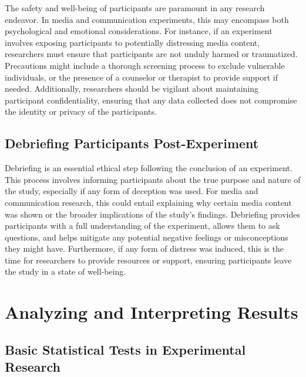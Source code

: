\documentclass[
  b5paper]{book}
\begin{document}
The safety and well-being of participants are paramount in any research endeavor. In media and communication experiments, this may encompass both psychological and emotional considerations. For instance, if an experiment involves exposing participants to potentially distressing media content, researchers must ensure that participants are not unduly harmed or traumatized. Precautions might include a thorough screening process to exclude vulnerable individuals, or the presence of a counselor or therapist to provide support if needed. Additionally, researchers should be vigilant about maintaining participant confidentiality, ensuring that any data collected does not compromise the identity or privacy of the participants.

\hypertarget{debriefing-participants-post-experiment}{%
\subsection*{Debriefing Participants Post-Experiment}\label{debriefing-participants-post-experiment}}

Debriefing is an essential ethical step following the conclusion of an experiment. This process involves informing participants about the true purpose and nature of the study, especially if any form of deception was used. For media and communication research, this could entail explaining why certain media content was shown or the broader implications of the study's findings. Debriefing provides participants with a full understanding of the experiment, allows them to ask questions, and helps mitigate any potential negative feelings or misconceptions they might have. Furthermore, if any form of distress was induced, this is the time for researchers to provide resources or support, ensuring participants leave the study in a state of well-being.

\hypertarget{analyzing-and-interpreting-results}{%
\section{Analyzing and Interpreting Results}\label{analyzing-and-interpreting-results}}

\hypertarget{basic-statistical-tests-in-experimental-research}{%
\subsection*{Basic Statistical Tests in Experimental Research}\label{basic-statistical-tests-in-experimental-research}}
\end{document}
